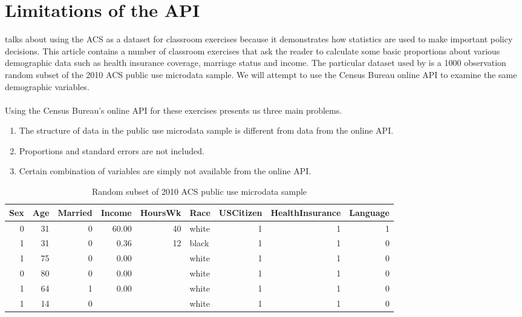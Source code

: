 \documentclass{article}\usepackage[]{graphicx}\usepackage[]{color}
\begin{document}
\section{Limitations of the API}
\citet{stangl:2013} talks about using the ACS as a dataset for classroom exercises because it demonstrates how statistics are used to make important policy decisions.  This article contains a number of classroom exercises that ask the reader to calculate some basic proportions about various demographic data such as health insurance coverage, marriage status and income.  The particular dataset used by \citet{stangl:2013} is a 1000 observation random subset of the 2010 ACS public use microdata sample.  We will attempt to use the Census Bureau online API to examine the same demographic variables.\\
\\
Using the Census Bureau's online API for these exercises presents us three main problems.  
\begin{enumerate}
\item The structure of data in the public use microdata sample is different from data from the online API.
\item Proportions and standard errors are not included.
\item Certain combination of variables are simply not available from the online API.
\end{enumerate}

\begin{table}[ht]
\centering
\begin{tabular}{rrrrrlrrr}
  \hline
Sex & Age & Married & Income & HoursWk & Race & USCitizen & HealthInsurance & Language \\ 
  \hline
  0 &  31 &   0 & 60.00 &  40 & white &   1 &   1 &   1 \\ 
    1 &  31 &   0 & 0.36 &  12 & black &   1 &   1 &   0 \\ 
    1 &  75 &   0 & 0.00 &  & white &   1 &   1 &   0 \\ 
    0 &  80 &   0 & 0.00 &  & white &   1 &   1 &   0 \\ 
    1 &  64 &   1 & 0.00 &  & white &   1 &   1 &   0 \\ 
    1 &  14 &   0 &  &  & white &   1 &   1 &   0 \\ 
   \hline
\end{tabular}
\caption{Random subset of 2010 ACS public use microdata sample} 
\label{tab:table}
\end{table}
\end{document}
